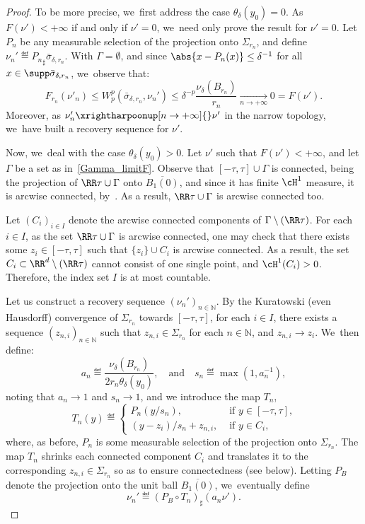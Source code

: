 \begin{proof}
To be more precise, we~first address the case $\theta_\delta(y_0)=0$. As $F(\nu')<+\infty$ if and only if $\nu'=0$, we~need only prove the result for $\nu'=0$. Let $P_n$ be any measurable selection of the projection onto ${\Sigma_{r_n}}$, and define $\nu_n'\eqdef {P_n}_{\sharp} \bar \sigma_{\delta, r_n}$. With $\Gamma=\emptyset$, and since $\abs{x-P_n(x)}\le \delta^{-1}$ for all $x\in \supp \bar \sigma_{\delta,r_n}$, we~observe that:
\[
F_{r_n}(\nu'_n)\le W_p^p(\bar \sigma_{\delta, r_n},\nu_n')\le \delta^{-p} \frac{\nu_\delta(B_{r_n})}{r_n} \xrightarrow[n\to +\infty]{} 0 = F(\nu').
\]
Moreover, as $\nu'_n \xrightharpoonup[n \to +\infty]{} \nu'$ in the narrow topology, we~have built a recovery sequence for $\nu'$.

Now, we~deal with the case $\theta_{\delta}(y_0)>0$. Let $\nu'$ such that $F(\nu') < +\infty$, and let $\Gamma$ be a set as in~\eqref{Gamma_limitF}. Observe that $[-\tau,\tau]\cup \Gamma$ is connected, being the projection of $\RR\tau\cup \Gamma$ onto $\overline{B_1(0)}$, and since it has finite $\cH^1$ measure, it is arcwise connected, by~\cite[Prop.\,30.1, Cor.\,30.2]{david2006singular}. As a result, $\RR\tau\cup\Gamma$ is arcwise connected too.

Let $(C_{i})_{i\in I}$ denote the arcwise connected components of $\Gamma\setminus (\RR\tau)$. For each $i \in I$, as the set $\RR\tau\cup \Gamma$ is arcwise connected, one may check that there exists some $z_i\in [-\tau,\tau]$ such that $\{z_{i}\}\cup C_{i}$ is arcwise connected. As a result, the set $C_{i} \subset \RR^{d}\setminus(\RR\tau)$ cannot consist of one single point, and $\cH^1(C_i)>0$. Therefore, the index set $I$ is at most countable.

Let us construct a recovery sequence $(\nu_n')_{n\in \mathbb{N}}$. By the Kuratowski (even Hausdorff) convergence of $\Sigma_{r_{n}}$
towards $[-\tau,\tau]$, for each $i\in I$, there exists a sequence $(z_{n,i})_{n\in \mathbb{N}}$ such that $z_{n,i}\in \Sigma_{r_{n}}$ for each $n\in \mathbb{N}$, and $z_{n,i}\to z_i$. We~then define:
\begin{equation*}
a_n\eqdef \frac{\nu_{\delta}(B_{r_n})}{2r_n\theta_{\delta}(y_0)},
\quad\mbox{and}\quad
s_n\eqdef \max(1,a_{n}^{-1}),
\end{equation*}
noting that $a_n\to 1$ and $s_n\to 1$, and we introduce the map $T_n$,
\[
T_n(y)
\eqdef
\begin{cases}
P_n(y/s_{n}),& \text{ if $y \in [-\tau, \tau]$,} \\
(y-z_{i})/s_n+z_{n,i},& \text{ if $y \in C_i$},
\end{cases}
\]
where, as before, $P_n$ is some measurable selection of the projection onto ${\Sigma_{r_n}}$. The map $T_n$ shrinks each connected component $C_i$ and translates it to the corresponding $z_{n,i} \in \Sigma_{r_n}$ so as to ensure connectedness (see below). Letting $P_B$ denote the projection onto the unit ball $\overline{B_1(0)}$, we~eventually define
\[
\nu_n'\eqdef (P_B\circ T_n)_{\sharp}(a_n\nu').
\]


\end{proof}
